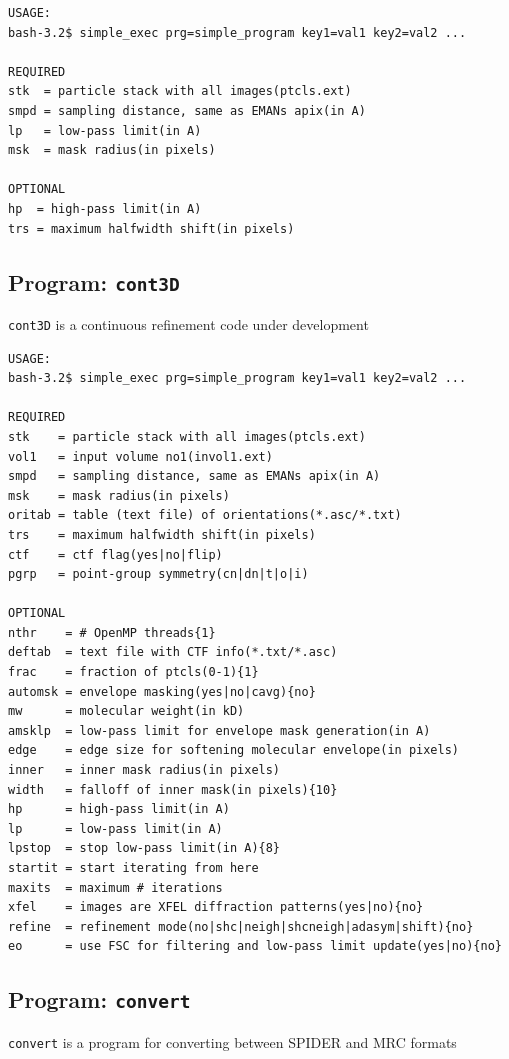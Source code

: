 \documentclass[a4paper,11pt]{article}
\newcommand{\prgname}[1]{\textcolor{NavyBlue}{\texttt{#1}}}
\begin{document}
\begin{verbatim}
USAGE:
bash-3.2$ simple_exec prg=simple_program key1=val1 key2=val2 ...

REQUIRED
stk  = particle stack with all images(ptcls.ext)
smpd = sampling distance, same as EMANs apix(in A)
lp   = low-pass limit(in A)
msk  = mask radius(in pixels)

OPTIONAL
hp  = high-pass limit(in A)
trs = maximum halfwidth shift(in pixels)
\end{verbatim}

\subsection{Program: \prgname{cont3D}}
\label{cont3D}
\prgname{cont3D} is a continuous refinement code under development

\begin{verbatim}
USAGE:
bash-3.2$ simple_exec prg=simple_program key1=val1 key2=val2 ...

REQUIRED
stk    = particle stack with all images(ptcls.ext)
vol1   = input volume no1(invol1.ext)
smpd   = sampling distance, same as EMANs apix(in A)
msk    = mask radius(in pixels)
oritab = table (text file) of orientations(*.asc/*.txt)
trs    = maximum halfwidth shift(in pixels)
ctf    = ctf flag(yes|no|flip)
pgrp   = point-group symmetry(cn|dn|t|o|i)

OPTIONAL
nthr    = # OpenMP threads{1}
deftab  = text file with CTF info(*.txt/*.asc)
frac    = fraction of ptcls(0-1){1}
automsk = envelope masking(yes|no|cavg){no}
mw      = molecular weight(in kD)
amsklp  = low-pass limit for envelope mask generation(in A)
edge    = edge size for softening molecular envelope(in pixels)
inner   = inner mask radius(in pixels)
width   = falloff of inner mask(in pixels){10}
hp      = high-pass limit(in A)
lp      = low-pass limit(in A)
lpstop  = stop low-pass limit(in A){8}
startit = start iterating from here
maxits  = maximum # iterations
xfel    = images are XFEL diffraction patterns(yes|no){no}
refine  = refinement mode(no|shc|neigh|shcneigh|adasym|shift){no}
eo      = use FSC for filtering and low-pass limit update(yes|no){no}
\end{verbatim}

\subsection{Program: \prgname{convert}}
\label{convert}
\prgname{convert} is a program for converting between SPIDER and MRC formats 
\end{document}
